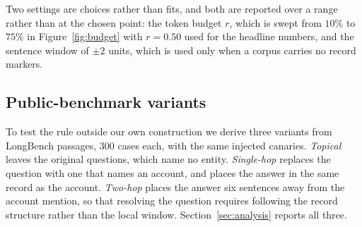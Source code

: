Two settings are choices rather than fits, and both are reported over a range rather than at the
chosen point: the token budget $r$, which is swept from $10\%$ to $75\%$ in
Figure~\ref{fig:budget} with $r=0.50$ used for the headline numbers, and the sentence window of
$\pm2$ units, which is used only when a corpus carries no record markers.

\subsection{Public-benchmark variants}

To test the rule outside our own construction we derive three variants from LongBench
passages, $300$ cases each, with the same injected canaries. \emph{Topical} leaves the
original questions, which name no entity. \emph{Single-hop} replaces the question with one
that names an account, and places the answer in the same record as the account.
\emph{Two-hop} places the answer six sentences away from the account mention, so that
resolving the question requires following the record structure rather than the local
window. Section~\ref{sec:analysis} reports all three.
